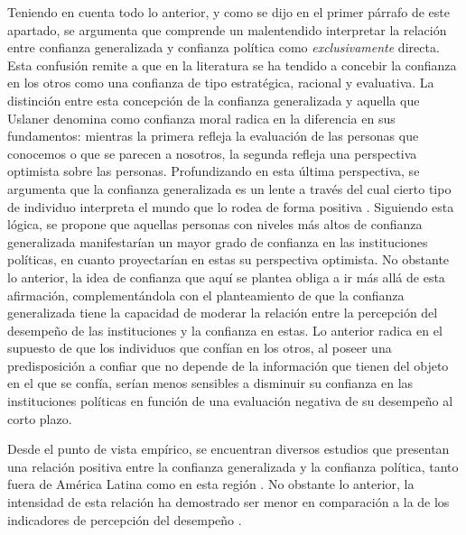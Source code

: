 \documentclass[12pt,twoside]{templates/facsothesis}
\begin{document}
Teniendo en cuenta todo lo anterior, y como se dijo en el primer párrafo de este apartado, se argumenta que comprende un malentendido interpretar la relación entre confianza generalizada y confianza política como \emph{exclusivamente} directa. Esta confusión remite a que en la literatura se ha tendido a concebir la confianza en los otros como una confianza de tipo estratégica, racional y evaluativa. La distinción entre esta concepción de la confianza generalizada y aquella que Uslaner \citetext{\citeyear{uslanerMoralFoundationsTrust2002}; \citeyear{uslanerStudyTrust2017}} denomina como confianza moral radica en la diferencia en sus fundamentos: mientras la primera refleja la evaluación de las personas que conocemos o que se parecen a nosotros, la segunda refleja una perspectiva optimista sobre las personas. Profundizando en esta última perspectiva, se argumenta que la confianza generalizada es un lente a través del cual cierto tipo de individuo interpreta el mundo que lo rodea de forma positiva \citep{oskarssonGeneralizedTrustPolitical2010}. Siguiendo esta lógica, se propone que aquellas personas con niveles más altos de confianza generalizada manifestarían un mayor grado de confianza en las instituciones políticas, en cuanto proyectarían en estas su perspectiva optimista. No obstante lo anterior, la idea de confianza que aquí se plantea obliga a ir más allá de esta afirmación, complementándola con el planteamiento de que la confianza generalizada tiene la capacidad de moderar la relación entre la percepción del desempeño de las instituciones y la confianza en estas. Lo anterior radica en el supuesto de que los individuos que confían en los otros, al poseer una predisposición a confiar que no depende de la información que tienen del objeto en el que se confía, serían menos sensibles a disminuir su confianza en las instituciones políticas en función de una evaluación negativa de su desempeño al corto plazo.

Desde el punto de vista empírico, se encuentran diversos estudios que presentan una relación positiva entre la confianza generalizada y la confianza política, tanto fuera de América Latina \citep{brehmIndividualLevelEvidenceCauses1997, dellmuthWhyNationalInternational2020, mattesSocialPoliticalTrust2018, zmerliWinnersLosersThree2013} como en esta región \citep{bargstedSocialPoliticalTrust2023, boothLegitimacyPuzzleLatin2009, mainwaringStateDeficienciesParty2006, mattesSocialPoliticalTrust2018, morrisCorruptionTrustTheoretical2010}. No obstante lo anterior, la intensidad de esta relación ha demostrado ser menor en comparación a la de los indicadores de percepción del desempeño \citep{mainwaringStateDeficienciesParty2006, mattesSocialPoliticalTrust2018, morrisCorruptionTrustTheoretical2010, newtonSocialPoliticalTrust2017}.
\end{document}
